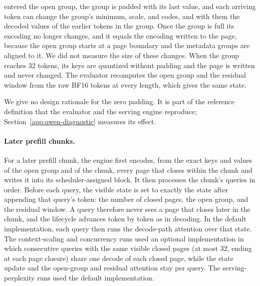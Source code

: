 \documentclass{article}
\begin{document}
\begin{itemize}
  entered the open group, the group is padded with its last value, and each arriving token can change
  the group's minimum, scale, and codes, and with them the decoded values of the earlier tokens in the
  group. Once the group is full its encoding no longer changes, and it equals the encoding written to
  the page, because the open group starts at a page boundary and the metadata groups are aligned to it.
  We did not measure the size of these changes. When the group
  reaches 32 tokens, its keys are quantized without padding and the page is written and never changed.
  The evaluator recomputes the open group and the residual window from the raw BF16 tokens at every
  length, which gives the same state.
\end{itemize}
We give no design rationale for the zero padding. It is part of the reference definition that the
evaluator and the serving engine reproduce; Section~\ref{app:qwen-diagnostic} measures its effect.

\paragraph{Later prefill chunks.}
For a later prefill chunk, the engine first encodes, from the exact keys and values of the open group
and of the chunk, every page that closes within the chunk and writes it into its scheduler-assigned
block. It then processes the chunk's queries in order. Before each query, the visible state is set to
exactly the state after appending that query's token: the number of closed pages, the open group, and
the residual window. A query therefore never sees a page that closes later in the chunk, and the
lifecycle advances token by token as in decoding. In the default implementation, each query then runs
the decode-path attention over that state. The context-scaling and concurrency runs used an optional
implementation in which consecutive queries with the same visible closed pages (at most 32, ending at
each page closure) share one decode of each closed page, while the state update and the open-group and
residual attention stay per query. The serving-perplexity runs used the default implementation.
\end{document}
